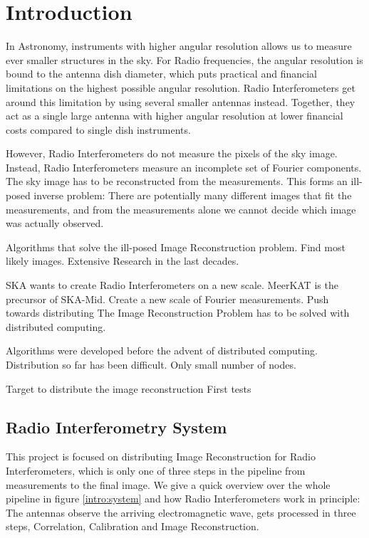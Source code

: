 \section{Introduction}
In Astronomy, instruments with higher angular resolution allows us to measure ever smaller structures in the sky. For Radio frequencies, the angular resolution is bound to the antenna dish diameter, which puts practical and financial limitations on the highest possible angular resolution. Radio Interferometers get around this limitation by using several smaller antennas instead. Together, they act as a single large antenna with higher angular resolution at lower financial costs compared to single dish instruments.

However, Radio Interferometers do not measure the pixels of the sky image. Instead, Radio Interferometers measure an incomplete set of Fourier components. The sky image has to be reconstructed from the measurements. This forms an ill-posed inverse problem: There are potentially many different images that fit the measurements, and 
from the measurements alone we cannot decide which image was actually observed.

Algorithms that solve the ill-posed Image Reconstruction problem. Find most likely images. Extensive Research in the last decades.

SKA wants to create Radio Interferometers on a new scale.
MeerKAT is the precursor of SKA-Mid. Create a new scale of Fourier measurements.
Push towards distributing
The Image Reconstruction Problem has to be solved with distributed computing.

Algorithms were developed before the advent of distributed computing. 
Distribution so far has been difficult. Only small number of nodes.


Target to distribute the image reconstruction
First tests


\subsection{Radio Interferometry System}\label{intro:sys}
This project is focused on distributing Image Reconstruction for Radio Interferometers, which is only one of three steps in the pipeline from measurements to the final image. We give a quick overview over the whole pipeline in figure \ref{intro:system} and how Radio Interferometers work in principle: The antennas observe the arriving electromagnetic wave, gets processed in three steps, Correlation, Calibration and Image Reconstruction. 

